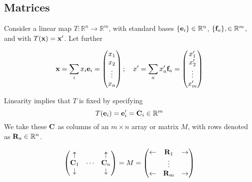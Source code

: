 \subsection{Matrices}
Consider a linear map \(T: \mathbb R^n \to \mathbb R^m\), with standard bases \(\{ \vb e_i \} \in \mathbb R^n\), \(\{ \vb f_a \}, \in \mathbb R^m\), and with \(T(\vb x) = \vb x'\).
Let further

\[
	\vb x = \sum_i x_i \vb e_i = \begin{pmatrix}
		x_1 \\ x_2 \\ \vdots \\ x_n
	\end{pmatrix};\quad x' = \sum_a x_a' \vb f_a = \begin{pmatrix}
		x_1' \\ x_2' \\ \vdots \\ x_m'
	\end{pmatrix}
\]

Linearity implies that \(T\) is fixed by specifying
\[
	T(\vb e_i) = \vb e_i' = \vb C_i \in \mathbb R^m
\]
We take these \(\vb C\) as columns of an \(m \times n\) array or matrix \(M\), with rows denoted as \(\vb R_a \in \mathbb R^n\).

\[
	\begin{pmatrix}
		\uparrow   &        & \uparrow   \\
		\vb C_1    & \cdots & \vb C_n    \\
		\downarrow &        & \downarrow
	\end{pmatrix} = M = \begin{pmatrix}
		\leftarrow & \vb R_1 & \rightarrow \\
		           & \vdots  &             \\
		\leftarrow & \vb R_m & \rightarrow
	\end{pmatrix}
\]

